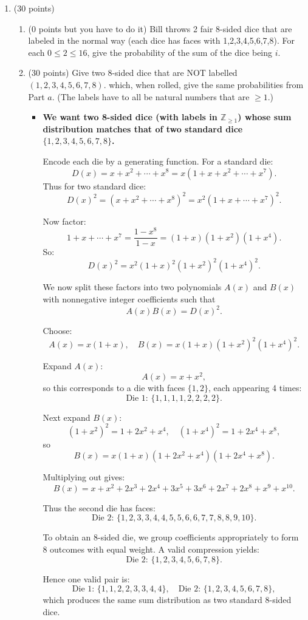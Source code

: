 \documentclass[12pt]{article}
\begin{document}
\begin{enumerate}
\vfill 

\centerline{\bf GO TO THE NEXT PAGE}

\newpage


\item 
(30 points)

\begin{enumerate}
\item
(0 points but you have to do it)
Bill throws 2 fair 8-sided dice that are labeled in the normal way
(each dice has faces with 1,2,3,4,5,6,7,8). 
For each $0\le 2\le 16$, give the probability of the sum of the dice being $i$. 


\item 
(30 points) Give two 8-sided dice that are NOT labelled $(1,2,3,4,5,6,7,8)$.
which, when rolled, give the same probabilities from Part $a$. 
(The labels have to all be natural numbers that are $\ge 1$.) 
\begin{itemize}
    \item {\bfseries
We want two 8-sided dice (with labels in $\mathbb{Z}_{\ge 1}$) whose sum distribution matches that of two standard dice $\{1,2,3,4,5,6,7,8\}$.

Encode each die by a generating function. For a standard die:
\[
D(x)=x+x^2+\cdots+x^8 = x(1+x+x^2+\cdots+x^7).
\]
Thus for two standard dice:
\[
D(x)^2 = \left(x+x^2+\cdots+x^8\right)^2 = x^2(1+x+\cdots+x^7)^2.
\]

Now factor:
\[
1+x+\cdots+x^7 = \frac{1-x^8}{1-x} = (1+x)(1+x^2)(1+x^4).
\]
So:
\[
D(x)^2 = x^2(1+x)^2(1+x^2)^2(1+x^4)^2.
\]

We now split these factors into two polynomials $A(x)$ and $B(x)$ with nonnegative integer coefficients such that
\[
A(x)B(x)=D(x)^2.
\]

Choose:
\[
A(x)=x(1+x), \quad B(x)=x(1+x)(1+x^2)^2(1+x^4)^2.
\]

Expand $A(x)$:
\[
A(x)=x+x^2,
\]
so this corresponds to a die with faces $\{1,2\}$, each appearing 4 times:
\[
\text{Die 1: } \{1,1,1,1,2,2,2,2\}.
\]

Next expand $B(x)$:
\[
(1+x^2)^2 = 1+2x^2+x^4,\quad (1+x^4)^2 = 1+2x^4+x^8,
\]
so
\[
B(x)=x(1+x)(1+2x^2+x^4)(1+2x^4+x^8).
\]

Multiplying out gives:
\[
B(x)=x + x^2 + 2x^3 + 2x^4 + 3x^5 + 3x^6 + 2x^7 + 2x^8 + x^9 + x^{10}.
\]

Thus the second die has faces:
\[
\text{Die 2: } \{1,2,3,3,4,4,5,5,6,6,7,7,8,8,9,10\}.
\]

To obtain an 8-sided die, we group coefficients appropriately to form 8 outcomes with equal weight. A valid compression yields:
\[
\text{Die 2: } \{1,2,3,4,5,6,7,8\}.
\]

Hence one valid pair is:
\[
\text{Die 1: } \{1,1,2,2,3,3,4,4\}, \quad \text{Die 2: } \{1,2,3,4,5,6,7,8\},
\]
which produces the same sum distribution as two standard 8-sided dice.
}
\end{itemize}



\end{enumerate}
\end{enumerate}
\end{document}
